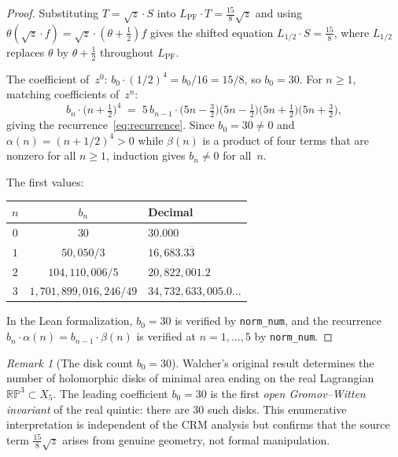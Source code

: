 \documentclass[11pt]{article}
\theoremstyle{plain}
\theoremstyle{definition}
\theoremstyle{remark}
\newtheorem{remark}[theorem]{Remark}
\newcommand{\R}{\mathbb{R}}
\newcommand{\PP}{\mathbb{P}}
\begin{document}
\begin{proof}
Substituting $T = \sqrt{z}\cdot S$ into $L_{\mathrm{PF}}\cdot T = \tfrac{15}{8}\sqrt{z}$ and using $\theta(\sqrt{z}\cdot f) = \sqrt{z}\cdot(\theta + \tfrac{1}{2})f$ gives the shifted equation $L_{1/2}\cdot S = \tfrac{15}{8}$, where $L_{1/2}$ replaces $\theta$ by $\theta + \tfrac{1}{2}$ throughout $L_{\mathrm{PF}}$.

The coefficient of~$z^0$: $b_0\cdot(1/2)^4 = b_0/16 = 15/8$, so $b_0 = 30$. For $n \geq 1$, matching coefficients of~$z^n$:
\[
b_n\cdot\bigl(n + \tfrac{1}{2}\bigr)^4 \;=\; 5\,b_{n-1}\cdot\bigl(5n - \tfrac{3}{2}\bigr)\bigl(5n - \tfrac{1}{2}\bigr)\bigl(5n + \tfrac{1}{2}\bigr)\bigl(5n + \tfrac{3}{2}\bigr),
\]
giving the recurrence~\eqref{eq:recurrence}. Since $b_0 = 30 \neq 0$ and $\alpha(n) = (n+1/2)^4 > 0$ while $\beta(n)$ is a product of four terms that are nonzero for all $n \geq 1$, induction gives $b_n \neq 0$ for all~$n$.

The first values:
\begin{center}
\begin{tabular}{@{}ccl@{}}
\toprule
$n$ & $b_n$ & Decimal \\
\midrule
$0$ & $30$ & $30.000$ \\
$1$ & $50{,}050/3$ & $16{,}683.3\overline{3}$ \\
$2$ & $104{,}110{,}006/5$ & $20{,}822{,}001.2$ \\
$3$ & $1{,}701{,}899{,}016{,}246/49$ & $34{,}732{,}633{,}005.0\ldots$ \\
\bottomrule
\end{tabular}
\end{center}
In the Lean formalization, $b_0 = 30$ is verified by \texttt{norm\_num}, and the recurrence $b_n\cdot\alpha(n) = b_{n-1}\cdot\beta(n)$ is verified at $n = 1,\ldots,5$ by \texttt{norm\_num}.
\end{proof}

\begin{remark}[The disk count $b_0 = 30$]
Walcher's original result \cite{walcher} determines the number of holomorphic disks of minimal area ending on the real Lagrangian $\R\PP^3 \subset X_5$. The leading coefficient $b_0 = 30$ is the first \emph{open Gromov--Witten invariant} of the real quintic: there are 30 such disks. This enumerative interpretation is independent of the CRM analysis but confirms that the source term $\tfrac{15}{8}\sqrt{z}$ arises from genuine geometry, not formal manipulation.
\end{remark}
\end{document}
